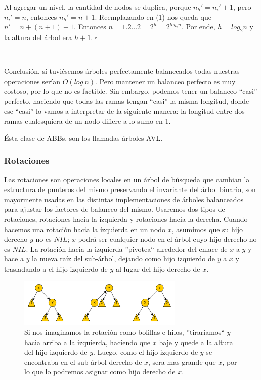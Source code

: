 Al agregar un nivel, la cantidad de nodos se duplica, porque $n_h' = n_i' + 1$, pero $n_i' = n$, entonces $n_h' = n +1$. Reemplazando en (1) nos queda que $n' = n + (n + 1) + 1$. Entonces $n = 1 $.$ 2 \dots 2 = 2^h = 2^{log_2 n}$.
Por ende, $h = log_2n$ y la altura del \'arbol era $h+1$. $\square$

~

Conclusi\'on, s\'i tuvi\'esemos \'arboles perfectamente balanceados todas nuestras operaciones ser\'ian $O(log\ n)$. Pero mantener un balanceo perfecto es muy costoso, por lo que no es factible.
Sin embargo, podemos tener un balanceo ``casi'' perfecto, haciendo que todas las ramas tengan ``casi'' la misma longitud, donde ese ``casi'' lo vamos a interpretar de la siguiente manera: la longitud entre dos ramas cualesquiera de un nodo difiere a lo sumo en 1.

\'Esta clase de ABBs, son los llamadas \'arboles AVL.

\subsubsection{Rotaciones}

Las rotaciones son operaciones locales en un \'arbol de b\'usqueda que cambian la estructura de punteros del mismo preservando el invariante del \'arbol binario, son mayormente usadas en las distintas implementaciones de \'arboles balanceados para ajustar los factores de balanceo del mismo. Usaremos dos tipos de rotaciones, rotaciones hacia la izquierda y rotaciones hacia la derecha. Cuando hacemos una rotaci\'on hacia la izquierda en un nodo $x$, asumimos que su hijo derecho $y$ no es $NIL$; $x$ podr\'a ser cualquier nodo en el \'arbol cuyo hijo derecho no es $NIL$. La rotaci\'on hacia la izquierda ''pivotea`` alrededor del enlace de $x$ a $y$ y hace a $y$ la nueva ra\'iz del sub-\'arbol, dejando como hijo izquierdo de $y$ a $x$ y trasladando a el hijo izquierdo de $y$ al lugar del hijo derecho de $x$. 

\begin{figure}
 \centering
 \includegraphics[width=0.7\textwidth]{graficos/RBRotacionIzq.pdf}
 \caption*{\newline \footnotesize Si nos imaginamos la rotaci\'on como bolillas e hilos, ''tirar\'iamos`` $y$ hacia arriba a la izquierda, haciendo que $x$ baje y quede a la altura del hijo izquierdo de $y$. Luego, como el hijo izquierdo de $y$ se encontraba en el sub-\'arbol derecho de $x$, sera mas grande que $x$, por lo que lo podremos asignar como hijo derecho de $x$.}
\end{figure}

